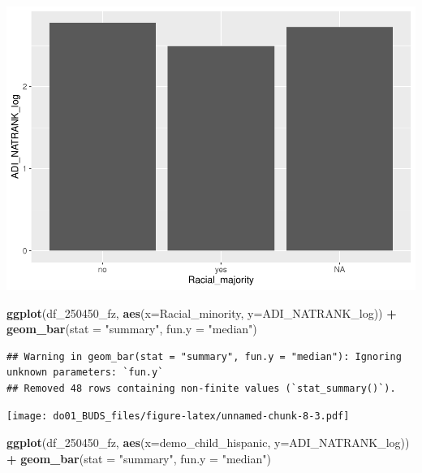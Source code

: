 \documentclass[
]{article}
\newenvironment{Shaded}{\begin{snugshade}}{\end{snugshade}}
\newcommand{\AttributeTok}[1]{\textcolor[rgb]{0.13,0.29,0.53}{#1}}
\newcommand{\FunctionTok}[1]{\textcolor[rgb]{0.13,0.29,0.53}{\textbf{#1}}}
\newcommand{\NormalTok}[1]{#1}
\newcommand{\SpecialCharTok}[1]{\textcolor[rgb]{0.81,0.36,0.00}{\textbf{#1}}}
\newcommand{\StringTok}[1]{\textcolor[rgb]{0.31,0.60,0.02}{#1}}
\begin{document}
\includegraphics{do01_BUDS_files/figure-latex/unnamed-chunk-8-2.pdf}

\begin{Shaded}
\begin{Highlighting}[]
\FunctionTok{ggplot}\NormalTok{(df\_250450\_fz, }\FunctionTok{aes}\NormalTok{(}\AttributeTok{x=}\NormalTok{Racial\_minority, }\AttributeTok{y=}\NormalTok{ADI\_NATRANK\_log)) }\SpecialCharTok{+}
  \FunctionTok{geom\_bar}\NormalTok{(}\AttributeTok{stat =} \StringTok{"summary"}\NormalTok{, }\AttributeTok{fun.y =} \StringTok{"median"}\NormalTok{)}
\end{Highlighting}
\end{Shaded}

\begin{verbatim}
## Warning in geom_bar(stat = "summary", fun.y = "median"): Ignoring unknown parameters: `fun.y`
## Removed 48 rows containing non-finite values (`stat_summary()`).
\end{verbatim}

\texttt{[image: do01\_BUDS\_files/figure-latex/unnamed-chunk-8-3.pdf]}

\begin{Shaded}
\begin{Highlighting}[]
\FunctionTok{ggplot}\NormalTok{(df\_250450\_fz, }\FunctionTok{aes}\NormalTok{(}\AttributeTok{x=}\NormalTok{demo\_child\_hispanic, }\AttributeTok{y=}\NormalTok{ADI\_NATRANK\_log)) }\SpecialCharTok{+}
  \FunctionTok{geom\_bar}\NormalTok{(}\AttributeTok{stat =} \StringTok{"summary"}\NormalTok{, }\AttributeTok{fun.y =} \StringTok{"median"}\NormalTok{)}
\end{Highlighting}
\end{Shaded}
\end{document}
